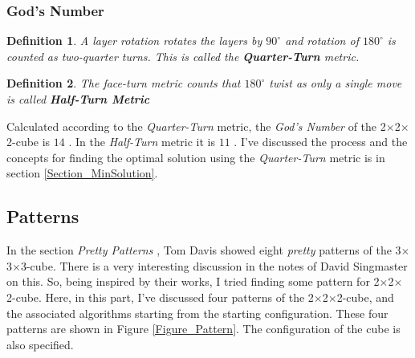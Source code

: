 \documentclass[12pt,a4paper]{article}
\theoremstyle{custom}
\newtheorem*{definition}{Definition}
\newcommand{\Ttwo}{2$\times$2$\times$2-}
\newcommand{\Tthree}{3$\times$3$\times$3-}
\begin{document}
\subsubsection{God's Number}\label{God}
\begin{definition}
    A layer rotation rotates the layers by $90^\circ$ and rotation of $180^\circ$ is counted as two-quarter turns. This is called the \textbf{Quarter-Turn} metric.
\end{definition}

 \begin{definition}
    The face-turn metric counts that $180^\circ$
twist as only a single move is called \textbf{Half-Turn Metric}
 \end{definition}

Calculated according to the \textit{Quarter-Turn} metric, the \textit{God's Number} of the \Ttwo cube is $14$ \cite{DJ}. In the \textit{Half-Turn} metric it is $11$ \cite{RMG, TR}.
I've discussed the process and the concepts for finding the optimal solution using the \textit{Quarter-Turn} metric is in section \ref{Section_MinSolution}.

\subsection{Patterns}
In the section \textit{Pretty Patterns} \cite{TD}, Tom Davis showed eight \textit{pretty} patterns of the \Tthree cube. There is a very interesting discussion in the notes of David Singmaster \cite{singmaster1980notes} on this. So, being inspired by their works, I tried finding some pattern for \Ttwo cube. Here, in this part, I've discussed four patterns of the \Ttwo cube, and the associated algorithms starting from the starting configuration. These four patterns are shown in Figure \ref{Figure_Pattern}.
The configuration of the cube is also specified.
\end{document}
